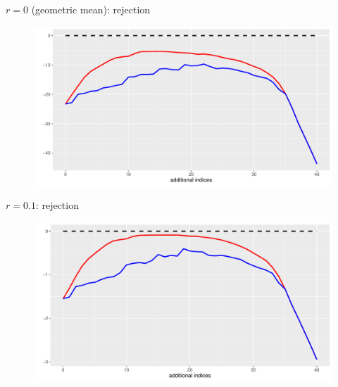 \documentclass[aspectratio=169]{beamer}
\begin{document}
\begin{frame}{$r=0$ (geometric mean): rejection}
\begin{figure}
\centering
\includegraphics[scale=0.6]{plot0.pdf}
\end{figure}
\end{frame}



\begin{frame}{$r=0.1$: rejection}
\begin{figure}
\centering
\includegraphics[scale=0.6]{plot01.pdf}
\end{figure}
\end{frame}

\end{document}
